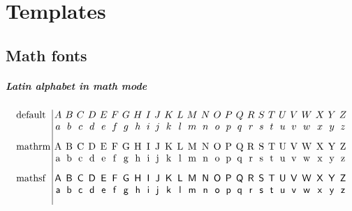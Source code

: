 \chapter{Templates}

\section{Math fonts}
\paragraph*{Latin alphabet in math mode}
\begin{align*}
 \arraycolsep=1.8pt
 \begin{array}{l|cccccccccccccccccccccccccc}
  \text{default} &
  A & B & C & D & E & F & G & H & I & J & K & L & M & N & O & P & Q & R & S & T & U & V & W & X & Y & Z \\
  \text{} &
  a & b & c & d & e & f & g & h & i & j & k & l & m & n & o & p & q & r & s & t & u & v & w & x & y & z \\[2ex]
  \text{mathrm} &
  \mathrm{A} & \mathrm{B} & \mathrm{C} & \mathrm{D} & \mathrm{E} & \mathrm{F} & \mathrm{G} & \mathrm{H} & \mathrm{I} & \mathrm{J} & \mathrm{K} & \mathrm{L} & \mathrm{M} & \mathrm{N} & \mathrm{O} & \mathrm{P} & \mathrm{Q} & \mathrm{R} & \mathrm{S} & \mathrm{T} & \mathrm{U} & \mathrm{V} & \mathrm{W} & \mathrm{X} & \mathrm{Y} & \mathrm{Z} \\
  \text{} &
  \mathrm{a} & \mathrm{b} & \mathrm{c} & \mathrm{d} & \mathrm{e} & \mathrm{f} & \mathrm{g} & \mathrm{h} & \mathrm{i} & \mathrm{j} & \mathrm{k} & \mathrm{l} & \mathrm{m} & \mathrm{n} & \mathrm{o} & \mathrm{p} & \mathrm{q} & \mathrm{r} & \mathrm{s} & \mathrm{t} & \mathrm{u} & \mathrm{v} & \mathrm{w} & \mathrm{x} & \mathrm{y} & \mathrm{z} \\[2ex]
  \text{mathsf} &
  \mathsf{A} & \mathsf{B} & \mathsf{C} & \mathsf{D} & \mathsf{E} & \mathsf{F} & \mathsf{G} & \mathsf{H} & \mathsf{I} & \mathsf{J} & \mathsf{K} & \mathsf{L} & \mathsf{M} & \mathsf{N} & \mathsf{O} & \mathsf{P} & \mathsf{Q} & \mathsf{R} & \mathsf{S} & \mathsf{T} & \mathsf{U} & \mathsf{V} & \mathsf{W} & \mathsf{X} & \mathsf{Y} & \mathsf{Z} \\
  \text{} &
  \mathsf{a} & \mathsf{b} & \mathsf{c} & \mathsf{d} & \mathsf{e} & \mathsf{f} & \mathsf{g} & \mathsf{h} & \mathsf{i} & \mathsf{j} & \mathsf{k} & \mathsf{l} & \mathsf{m} & \mathsf{n} & \mathsf{o} & \mathsf{p} & \mathsf{q} & \mathsf{r} & \mathsf{s} & \mathsf{t} & \mathsf{u} & \mathsf{v} & \mathsf{w} & \mathsf{x} & \mathsf{y} & \mathsf{z} \\[2ex]

\end{array}
\end{align*}
